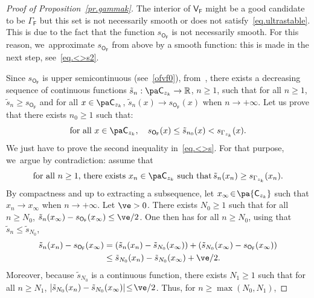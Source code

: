 \begin{proof}[Proof of Proposition~\ref{pr.gammak}]
The interior of $\mathsf V_{\mathsf F}$ might be a good candidate to be $\Gamma_{\mathsf F}$ but this set is not necessarily smooth or does not satisfy~\eqref{eq.ultrastable}. This is due to the fact that the function $s_{\mathsf O_{\mathsf F}}$ is not necessarily smooth. For this reason, we~approximate $s_{\mathsf O_{\mathsf F}}$ from above by a smooth function: this is made in
the next step, see~\eqref{eq.<>s2}.


Since $s_{\mathsf O_{\mathsf F}}$ is upper semicontinuous (see~\eqref{ofvf0}), from~\cite[Th.\,3]{tong1952some}, there exists a decreasing sequence of continuous functions $\tilde s_n:\pa \mathsf C_{z_k} \to \mathbb R$, $n\ge 1$, such that for all $n\ge 1$, $\tilde s_n\ge s_{\mathsf O_{\mathsf F}}$ and for all $x\in \pa \mathsf C_{z_k}$, $\tilde s_n(x)\to s_{\mathsf O_{\mathsf F}}(x)$ when $n\to +\infty$.
Let us prove that there exists $n_0\ge 1$ such that:
\begin{equation}\label{eq.<>s}
\text{for all } x\in \pa \mathsf C_{z_k}, \quad s_{\mathsf O_{\mathsf F}}(x)\le \tilde s_{n_0}(x)< s_{\Gamma_{z_k}}(x).
\end{equation}
We just have to prove the second inequality in~\eqref{eq.<>s}. For that purpose, we~argue by contradiction: assume that
\begin{equation}\label{geabs}
\text{for all $n\ge 1$, there exists
$x_n\in \pa \mathsf C_{z_k}$ such that}\, \tilde s_{n}(x_n)\ge s_{\Gamma_{z_k}}(x_n).
\end{equation}
By compactness and up to extracting a subsequence, let $x_{\infty}\!\in\! \pa { \mathsf C_{z_k}}$ such that \hbox{$x_n\!\to\! x_{\infty}$} when $n\to +\infty$. Let $\ve >0$. There exists $N_0\ge 1$ such that for all $n\ge N_0$, $\tilde s_{n}(x_{\infty})-\nobreak s_{\mathsf O_{\mathsf F}}(x_{\infty}) \le \ve/2$.
One then has for all $n\ge N_0$, using that $\tilde s_{n}\le \tilde s_{N_0}$,
\begin{align*}
\tilde s_{n}(x_n)- s_{\mathsf O_{\mathsf F}}(x_{\infty})&=(\tilde
s_{n}(x_n)-\tilde
s_{N_0}(x_{\infty}))+(\tilde
s_{N_0}(x_{\infty})-
s_{\mathsf
O_{\mathsf
F}}(x_{\infty}))\\
&\le \tilde s_{N_0}(x_n)-\tilde s_{N_0}(x_{\infty}) + \ve/2.
\end{align*}
Moreover, because $\tilde s_{N_0}$ is a continuous function, there exists $N_1\!\ge\! 1$ such that for all $n\ge N_1$, $\vert \tilde s_{N_0}(x_n)-\tilde s_{N_0}(x_{\infty})\vert \!\le\! \ve/2$. Thus, for $n\!\ge\! \max(N_0,N_1)$,

\end{proof}
